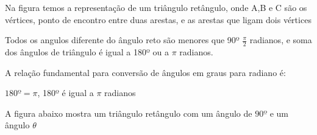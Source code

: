 \begin{multicols*}{2}
\begin{figure}[H]
\begin{tikzpicture}[x=0.75pt,y=0.75pt,yscale=-1,xscale=1]
        \end{tikzpicture}

    \end{figure}

    Na figura temos a representação de um triângulo retângulo, onde A,B e C são os vértices, ponto de 		encontro entre duas arestas, e as arestas que ligam dois vértices

    Todos os angulos diferente do ângulo reto são menores que 90º $\frac{\pi}{2}$ radianos, e soma dos 		ângulos de triângulo é 		igual a 180º ou a $\pi$ radianos.

    A relação fundamental para conversão de ângulos em graus para radiano é:

    $180º = \pi$, 180º é igual a $\pi$ radianos

    A figura abaixo mostra um triângulo retângulo com um ângulo de $90º$ e um ângulo $\theta$




    \begin{figure}[H]
        \centering
\end{figure}
\end{multicols*}
